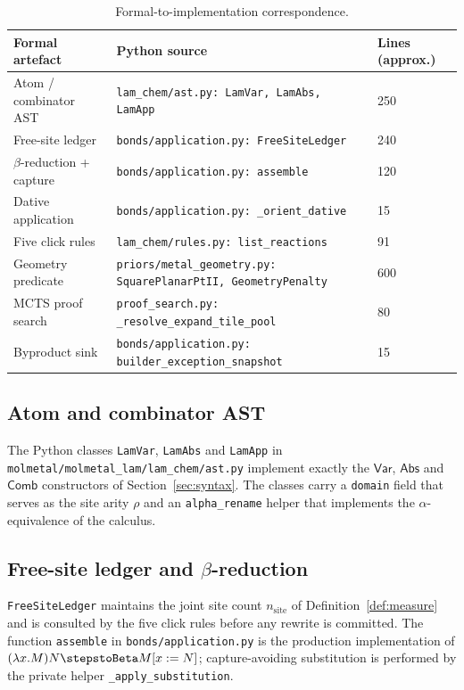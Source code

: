 \begin{table}[h]
\centering
\small
\begin{tabular}{lll}
\hline
\textbf{Formal artefact} & \textbf{Python source} & \textbf{Lines (approx.)} \\
\hline
Atom / combinator AST          & \texttt{lam\_chem/ast.py: LamVar, LamAbs, LamApp} & 250 \\
Free-site ledger               & \texttt{bonds/application.py: FreeSiteLedger}    & 240 \\
$\beta$-reduction + capture     & \texttt{bonds/application.py: assemble}          & 120 \\
Dative application             & \texttt{bonds/application.py: \_orient\_dative}  &  15 \\
Five click rules               & \texttt{lam\_chem/rules.py: list\_reactions}      &  91 \\
Geometry predicate             & \texttt{priors/metal\_geometry.py: SquarePlanarPtII, GeometryPenalty} & 600 \\
MCTS proof search              & \texttt{proof\_search.py: \_resolve\_expand\_tile\_pool} &  80 \\
Byproduct sink                 & \texttt{bonds/application.py: builder\_exception\_snapshot} &  15 \\
\hline
\end{tabular}
\caption{Formal-to-implementation correspondence.}
\label{tab:impl}
\end{table}

\subsection{Atom and combinator AST}
The Python classes \texttt{LamVar}, \texttt{LamAbs} and \texttt{LamApp} in
\texttt{molmetal/molmetal\_lam/lam\_chem/ast.py} implement exactly the
$\mathsf{Var}$, $\mathsf{Abs}$ and $\mathsf{Comb}$ constructors of
Section~\ref{sec:syntax}. The classes carry a \texttt{domain} field that
serves as the site arity $\rho$ and an \texttt{alpha\_rename} helper that
implements the $\alpha$-equivalence of the calculus.

\subsection{Free-site ledger and $\beta$-reduction}
\texttt{FreeSiteLedger} maintains the joint site count
$n_{\text{site}}$ of Definition~\ref{def:measure} and is consulted by the
five click rules before any rewrite is committed. The function
\texttt{assemble} in \texttt{bonds/application.py} is the production
implementation of $(\lambda x.M)N \stepstoBeta M[x:=N]$; capture-avoiding
substitution is performed by the private helper \texttt{\_apply\_substitution}.

